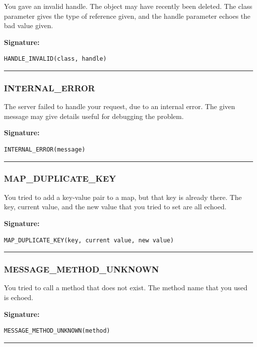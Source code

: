 You gave an invalid handle.  The object may have recently been deleted. 
The class parameter gives the type of reference given, and the handle
parameter echoes the bad value given.

\vspace{0.3cm}
{\bf Signature:}
\begin{verbatim}HANDLE_INVALID(class, handle)\end{verbatim}
\begin{center}\rule{10em}{0.1pt}\end{center}

\subsubsection{INTERNAL\_ERROR}

The server failed to handle your request, due to an internal error.  The
given message may give details useful for debugging the problem.

\vspace{0.3cm}
{\bf Signature:}
\begin{verbatim}INTERNAL_ERROR(message)\end{verbatim}
\begin{center}\rule{10em}{0.1pt}\end{center}

\subsubsection{MAP\_DUPLICATE\_KEY}

You tried to add a key-value pair to a map, but that key is already there. 
The key, current value, and the new value that you tried to set are all
echoed.

\vspace{0.3cm}
{\bf Signature:}
\begin{verbatim}MAP_DUPLICATE_KEY(key, current value, new value)\end{verbatim}
\begin{center}\rule{10em}{0.1pt}\end{center}

\subsubsection{MESSAGE\_METHOD\_UNKNOWN}

You tried to call a method that does not exist.  The method name that you
used is echoed.

\vspace{0.3cm}
{\bf Signature:}
\begin{verbatim}MESSAGE_METHOD_UNKNOWN(method)\end{verbatim}
\begin{center}\rule{10em}{0.1pt}\end{center}

